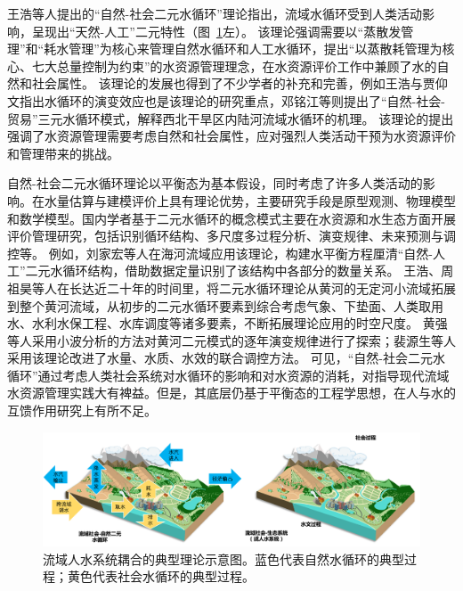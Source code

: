 王浩等人提出的“自然-社会二元水循环”理论指出，流域水循环受到人类活动影响，呈现出“天然-人工”二元特性\cite{wang2006}（图~\ref{ch1:fig:two_water_cycle}左）。
该理论强调需要以“蒸散发管理”和“耗水管理”为核心来管理自然水循环和人工水循环，提出“以蒸散耗管理为核心、七大总量控制为约束”的水资源管理理念，在水资源评价工作中兼顾了水的自然和社会属性\cite{wang2010}。
该理论的发展也得到了不少学者的补充和完善，例如王浩与贾仰文指出水循环的演变效应也是该理论的研究重点\cite{wang2016}，邓铭江等则提出了“自然-社会-贸易”三元水循环模式，解释西北干旱区内陆河流域水循环的机理\cite{deng2020}。
该理论的提出强调了水资源管理需要考虑自然和社会属性，应对强烈人类活动干预为水资源评价和管理带来的挑战。

自然-社会二元水循环理论以平衡态为基本假设，同时考虑了许多人类活动的影响。在水量估算与建模评价上具有理论优势，主要研究手段是原型观测、物理模型和数学模型。国内学者基于二元水循环的概念模式主要在水资源和水生态方面开展评价管理研究，包括识别循环结构、多尺度多过程分析、演变规律、未来预测与调控等\cite{wang2016}。
例如，刘家宏等人在海河流域应用该理论，构建水平衡方程厘清“自然-人工”二元水循环结构，借助数据定量识别了该结构中各部分的数量关系\cite{liu2010}。
王浩\cite{wang2004}、周祖昊\cite{zhou2022a}等人在长达近二十年的时间里，将二元水循环理论从黄河的无定河小流域拓展到整个黄河流域，从初步的二元水循环要素到综合考虑气象、下垫面、人类取用水、水利水保工程、水库调度等诸多要素，不断拓展理论应用的时空尺度。
黄强等人采用小波分析的方法对黄河二元模式的逐年演变规律进行了探索\cite{huang2002}；裴源生等人采用该理论改进了水量、水质、水效的联合调控方法\cite{pei2020}。
可见，“自然-社会二元水循环”通过考虑人类社会系统对水循环的影响和对水资源的消耗，对指导现代流域水资源管理实践大有裨益。但是，其底层仍基于平衡态的工程学思想，在人与水的互馈作用研究上有所不足。

\begin{figure}[htb]
    \centering
    \includegraphics[width=\textwidth]{img/ch1/ch1_two_water_cycle.png}
    \caption[流域人水耦合系统的典型理论示意图]{流域人水系统耦合的典型理论示意图\cite{wang2006,dibaldassarre2015}。蓝色代表自然水循环的典型过程；黄色代表社会水循环的典型过程。}\label{ch1:fig:two_water_cycle}
\end{figure}

